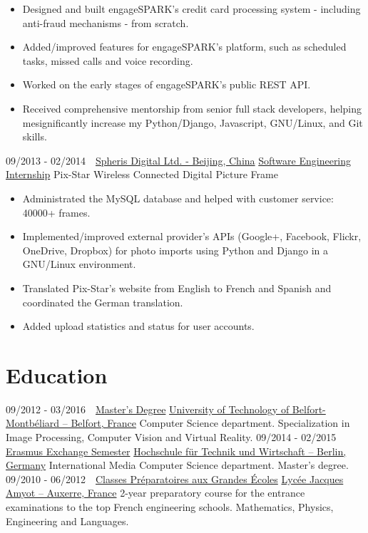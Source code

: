 \documentclass[]{friggeri-cv}
\begin{document}
\begin{itemize}
  \item Designed and built engageSPARK’s credit card processing system - including anti-fraud mechanisms - from scratch.
  \item Added/improved features for engageSPARK’s platform, such as scheduled tasks, missed calls and voice recording.
  \item Worked on the early stages of engageSPARK’s public REST API.
  \item Received comprehensive mentorship from senior full stack developers, helping mesignificantly increase my Python/Django, Javascript, GNU/Linux, and Git skills.
\end{itemize}
\begin{entrylist}
  \entry
    {09/2013 - 02/2014\, \,}
    {\href{https://www.pix-star.com/}{Spheris Digital Ltd. - Beijing, China}}
    {\href{https://www.pix-star.com/}{Software Engineering Internship}}
    {Pix-Star Wireless Connected Digital Picture Frame}
\end{entrylist}
\begin{itemize}
  \item Administrated the MySQL database and helped with customer service: 40000+ frames. 
  \item Implemented/improved external provider’s APIs (Google+, Facebook, Flickr, OneDrive, Dropbox) for photo imports using Python and Django in a GNU/Linux environment. 
  \item Translated Pix-Star’s website from English to French and Spanish and coordinated the German translation.
  \item Added upload statistics and status for user accounts.
\end{itemize}
  

\newpage
\section{Education}
\begin{entrylist}
  \entry
    {09/2012 - 03/2016\, \,}
    {\href{http://www.utbm.fr/}{Master's Degree}}
    {\href{http://www.utbm.fr/}{University of Technology of Belfort-Montbéliard – Belfort, France}}
    {Computer Science department. Specialization in Image Processing, Computer Vision  and Virtual Reality.}
  \entry
    {09/2014 - 02/2015\, \,}
    {\href{https://www.htw-berlin.de/}{Erasmus Exchange Semester}}
    {\href{https://www.htw-berlin.de/}{Hochschule für Technik und Wirtschaft – Berlin, Germany}}
    {International Media Computer Science department. Master’s degree.}
  \entry
    {09/2010 - 06/2012\, \,}
    {\href{http://lyc89-amyot.ac-dijon.fr/category/la-prepa/}{Classes Préparatoires aux Grandes Écoles}}
    {\href{http://lyc89-amyot.ac-dijon.fr/category/la-prepa/}{Lycée Jacques Amyot – Auxerre, France}}
    {2-year preparatory course for the entrance examinations to the top French engineering schools. Mathematics, Physics, Engineering and Languages.}
\end{entrylist}
\end{document}
